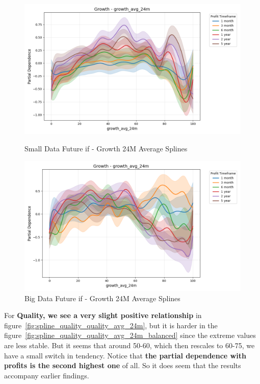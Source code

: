 \documentclass[11pt,english,a4paper,hidelinks]{book}
\begin{document}
\begin{figure}[H]
    \centering
    \begin{minipage}{0.48\textwidth}
        \centering
        \includegraphics[width=\textwidth]{images/code/models/general_regression/splines/2D/Small Data future - IF/growth_growth_avg_24m.png}
        \caption{Small Data Future \acrshort{if} - Growth 24M Average Splines}
        \label{fig:spline_growth_growth_avg_24m}
    \end{minipage}\hfill
    \begin{minipage}{0.48\textwidth}
        \centering
        \includegraphics[width=\textwidth]{images/code/models/general_regression/splines/2D/Big Data future - IF HARD Balanced/growth_growth_avg_24m.png}
        \caption{Big Data Future \acrshort{if} - Growth 24M Average Splines}
        \label{fig:spline_growth_growth_avg_24m_balanced}
    \end{minipage}
\end{figure}

\noindent For \textbf{Quality, we see a very slight positive relationship} in figure~\ref{fig:spline_quality_quality_avg_24m}, but it is harder in the figure~\ref{fig:spline_quality_quality_avg_24m_balanced} since the extreme values are less stable. But it seems that around 50-60, which then rescales to 60-75, we have a small switch in tendency. Notice that \textbf{the partial dependence with profits is the second highest one} of all. So it does seem that the results accompany earlier findings.
\end{document}
